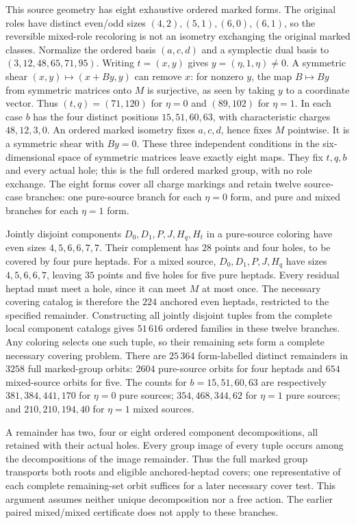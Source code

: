 This source geometry has eight exhaustive ordered marked forms.
The original roles have distinct even/odd sizes $(4,2),(5,1),
(6,0),(6,1)$, so the reversible mixed-role recoloring is not
an isometry exchanging the original marked classes. Normalize
the ordered basis $(a,c,d)$ and a symplectic dual basis to
$(3,12,48,65,71,95)$. Writing $t=(x,y)$ gives
$y=(\eta,1,\eta)\ne0$. A symmetric shear
$(x,y)\mapsto(x+By,y)$ can remove $x$: for nonzero $y$, the
map $B\mapsto By$ from symmetric matrices onto $M$ is surjective,
as seen by taking $y$ to a coordinate vector. Thus
$(t,q)=(71,120)$ for $\eta=0$ and $(89,102)$ for $\eta=1$.
In each case $b$ has the four distinct positions $15,51,60,63$,
with characteristic charges $48,12,3,0$. An ordered marked
isometry fixes $a,c,d$, hence fixes $M$ pointwise. It is a symmetric
shear with $By=0$. These three independent conditions in the
six-dimensional space of symmetric matrices leave exactly eight
maps. They fix $t,q,b$ and every actual hole; this is the full
ordered marked group, with no role exchange. The eight forms
cover all charge markings and retain twelve source-case branches:
one pure-source branch for each $\eta=0$ form, and pure and mixed
branches for each $\eta=1$ form.

Jointly disjoint components $D_0,D_1,P,J,H_q,H_t$ in a pure-source
coloring have even sizes $4,5,6,6,7,7$. Their complement has
$28$ points and four holes, to be covered by four pure heptads.
For a mixed source, $D_0,D_1,P,J,H_q$ have sizes $4,5,6,6,7$,
leaving $35$ points and five holes for five pure heptads.
Every residual heptad must meet a hole, since it can meet $M$
at most once. The necessary covering catalog is therefore the
$224$ anchored even heptads, restricted to the specified remainder.
Constructing all jointly disjoint tuples from the complete local
component catalogs gives $51\,616$ ordered families in these
twelve branches. Any coloring selects one such tuple, so their
remaining sets form a complete necessary covering problem.
There are $25\,364$ form-labelled distinct remainders in $3258$
full marked-group orbits: $2604$ pure-source orbits for four
heptads and $654$ mixed-source orbits for five. The counts for
$b=15,51,60,63$ are respectively $381,384,441,170$ for
$\eta=0$ pure sources; $354,468,344,62$ for $\eta=1$ pure
sources; and $210,210,194,40$ for $\eta=1$ mixed sources.

A remainder has two, four or eight ordered component
decompositions, all retained with their actual holes. Every
group image of every tuple occurs among the decompositions
of the image remainder. Thus the full marked group transports
both roots and eligible anchored-heptad covers; one representative
of each complete remaining-set orbit suffices for a later
necessary cover test. This argument assumes neither unique
decomposition nor a free action. The earlier paired mixed/mixed
certificate does not apply to these branches.

